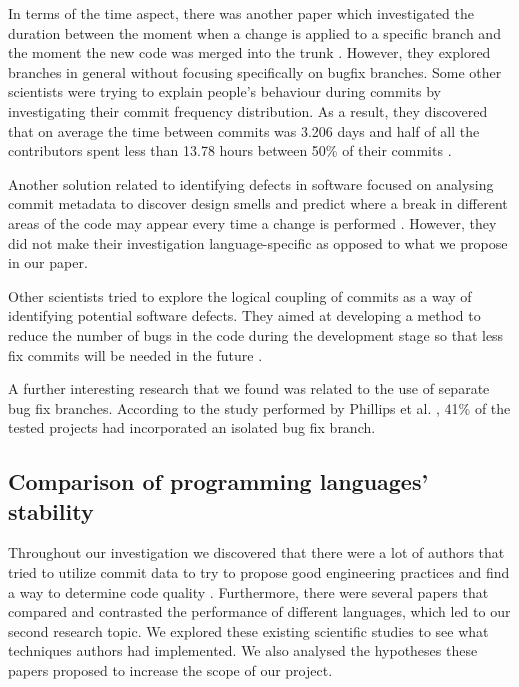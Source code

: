 In terms of the time aspect, there was another paper which investigated the duration between the moment when a change is applied to a specific branch and the moment the new code was merged into the trunk \cite{Williams2008}. However, they explored branches in general without focusing specifically on bugfix branches. Some other scientists were trying to explain people's behaviour during commits by investigating their commit frequency distribution. As a result, they discovered that on average the time between commits was 3.206 days and half of all the contributors spent less than 13.78 hours between 50\% of their commits \cite{Kolassa2013}.\par

Another solution related to identifying defects in software focused on analysing commit metadata to discover design smells and predict where a break in different areas of the code may appear every time a change is performed \cite{Oliva2013}. However, they did not make their investigation language-specific as opposed to what we propose in our paper.\par

Other scientists tried to explore the logical coupling of commits as a way of identifying potential software defects. They aimed at developing a method to reduce the number of bugs in the code during the development stage so that less fix commits will be needed in the future \cite{Steff2012}.\par

A further interesting research that we found was related to the use of separate bug fix branches. According to the study performed by Phillips et al. \cite{Phillips2011}, 41\% of the tested projects had incorporated an isolated bug fix branch.

\subsection{Comparison of programming languages' stability}
Throughout our investigation we discovered that there were a lot of authors that tried to utilize commit data to try to propose good engineering practices and find a way to determine code quality \cite{Agrawal2015}. Furthermore, there were several papers that compared and contrasted the performance of different languages, which led to our second research topic. We explored these existing scientific studies to see what techniques authors had implemented. We also analysed the hypotheses these papers proposed to increase the scope of our project.\par

